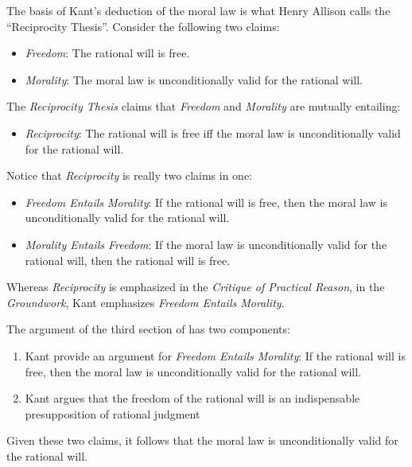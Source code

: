 The basis of Kant’s deduction of the moral law is what Henry Allison calls the ``Reciprocity Thesis''. Consider the following two claims:

\begin{itemize}
    \item \emph{Freedom}: The rational will is free.
    \item \emph{Morality}: The moral law is unconditionally valid for the rational will.
\end{itemize}

The \emph{Reciprocity Thesis} claims that \emph{Freedom} and \emph{Morality} are mutually entailing:

\begin{itemize}
    \item \emph{Reciprocity}: The rational will is free iff the moral law is unconditionally valid for the rational will.
\end{itemize}

Notice that \emph{Reciprocity} is really two claims in one:

\begin{itemize}
    \item \emph{Freedom Entails Morality}: If the rational will is free, then the moral law is unconditionally valid for the rational will.
    \item \emph{Morality Entails Freedom}: If the moral law is unconditionally valid for the rational will, then the rational will is free.
\end{itemize}


Whereas \emph{Reciprocity} is emphasized in the \emph{Critique of Practical Reason}, in the \emph{Groundwork}, Kant emphasizes \emph{Freedom Entails Morality}.

The argument of the third section of has two components:

\begin{enumerate}
    \item Kant provide an argument for \emph{Freedom Entails Morality}: If the rational will is free, then the moral law is unconditionally valid for the rational will.
    \item Kant argues that the freedom of the rational will is an indispensable presupposition of rational judgment
\end{enumerate}

Given these two claims, it follows that the moral law is unconditionally valid for the rational will. \change

